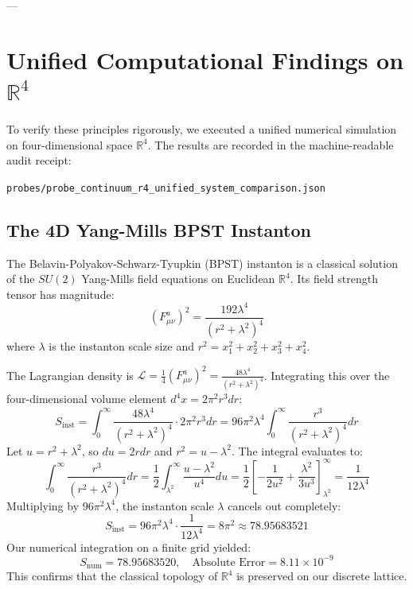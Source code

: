 \documentclass[11pt,a4paper]{article}
\begin{document}
---

\section{Unified Computational Findings on \texorpdfstring{$\mathbb{R}^4$}{R4}}

To verify these principles rigorously, we executed a unified numerical simulation on four-dimensional space $\mathbb{R}^4$. The results are recorded in the machine-readable audit receipt:
\begin{center}
\texttt{\small probes/probe\_continuum\_r4\_unified\_system\_comparison.json}
\end{center}

\subsection{The 4D Yang-Mills BPST Instanton}
The Belavin-Polyakov-Schwarz-Tyupkin (BPST) instanton is a classical solution of the $SU(2)$ Yang-Mills field equations on Euclidean $\mathbb{R}^4$. Its field strength tensor has magnitude:
$$(F_{\mu\nu}^a)^2 = \frac{192 \lambda^4}{(r^2 + \lambda^2)^4}$$
where $\lambda$ is the instanton scale size and $r^2 = x_1^2 + x_2^2 + x_3^2 + x_4^2$.

The Lagrangian density is $\mathcal{L} = \frac{1}{4} (F_{\mu\nu}^a)^2 = \frac{48 \lambda^4}{(r^2 + \lambda^2)^4}$. Integrating this over the four-dimensional volume element $d^4 x = 2\pi^2 r^3 dr$:
$$S_{\mathrm{inst}} = \int_0^\infty \frac{48 \lambda^4}{(r^2 + \lambda^2)^4} \cdot 2\pi^2 r^3 dr = 96 \pi^2 \lambda^4 \int_0^\infty \frac{r^3}{(r^2 + \lambda^2)^4} dr$$
Let $u = r^2 + \lambda^2$, so $du = 2r dr$ and $r^2 = u - \lambda^2$. The integral evaluates to:
$$\int_0^\infty \frac{r^3}{(r^2 + \lambda^2)^4} dr = \frac{1}{2} \int_{\lambda^2}^\infty \frac{u - \lambda^2}{u^4} du = \frac{1}{2} \left[ -\frac{1}{2 u^2} + \frac{\lambda^2}{3 u^3} \right]_{\lambda^2}^\infty = \frac{1}{12 \lambda^4}$$
Multiplying by $96 \pi^2 \lambda^4$, the instanton scale $\lambda$ cancels out completely:
$$S_{\mathrm{inst}} = 96 \pi^2 \lambda^4 \cdot \frac{1}{12 \lambda^4} = 8\pi^2 \approx 78.95683521$$
Our numerical integration on a finite grid yielded:
$$S_{\mathrm{num}} = 78.95683520, \quad \text{Absolute Error} = 8.11 \times 10^{-9}$$
This confirms that the classical topology of $\mathbb{R}^4$ is preserved on our discrete lattice.
\end{document}
